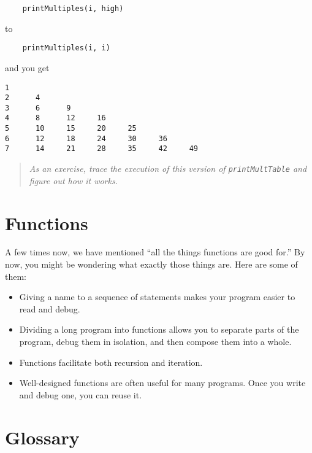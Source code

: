 \beforeverb
\begin{verbatim}
    printMultiples(i, high)
\end{verbatim}
\afterverb
%
to

\beforeverb
\begin{verbatim}
    printMultiples(i, i)
\end{verbatim}
\afterverb
%
and you get

\beforeverb
\begin{verbatim}
1
2      4
3      6      9
4      8      12     16
5      10     15     20     25
6      12     18     24     30     36
7      14     21     28     35     42     49
\end{verbatim}
\afterverb
%
\begin{quote}
{\em As an exercise, trace the execution of this version of
{\tt printMultTable} and figure out how it works.}
\end{quote}


\section{Functions}

A few times now, we have mentioned ``all the things functions are good
for.''  By now, you might be wondering what exactly those things are.
Here are some of them:

\begin{itemize}

\item Giving a name to a sequence of statements makes your program
easier to read and debug.

\item Dividing a long program into functions allows you to separate parts of
the program, debug them in isolation, and then compose them into a whole.

\item Functions facilitate both recursion and iteration.

\item Well-designed functions are often useful for many programs.  Once you
write and debug one, you can reuse it.

\end{itemize}


\section{Glossary}

